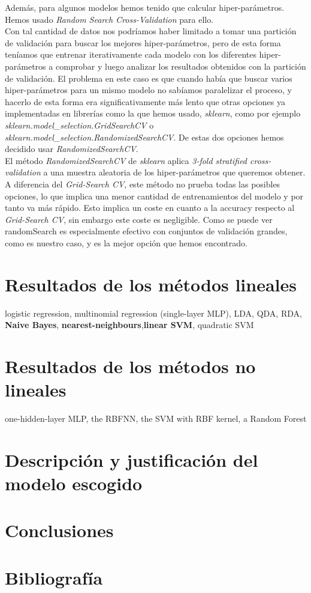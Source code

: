 \documentclass[a4paper]{article}
\begin{document}
Además, para algunos modelos hemos tenido que calcular hiper-parámetros. Hemos usado \textit{Random Search Cross-Validation} para ello.\\

Con tal cantidad de datos nos podríamos haber limitado a tomar una partición de validación para buscar los mejores hiper-parámetros, pero de esta forma teníamos que entrenar iterativamente cada modelo con los diferentes hiper-parámetros a comprobar y luego analizar los resultados obtenidos con la partición de validación. El problema en este caso es que cuando había que buscar varios hiper-parámetros para un mismo modelo no sabíamos paralelizar el proceso, y hacerlo de esta forma era significativamente más lento que otras opciones ya implementadas en librerías como la que hemos usado, \textit{sklearn}, como por ejemplo  \textit{sklearn.model\_selection.GridSearchCV} o \textit{sklearn.model\_selection.RandomizedSearchCV}. De estas dos opciones hemos decidido usar \textit{RandomizedSearchCV}.\\

El método \textit{RandomizedSearchCV} de \textit{sklearn} aplica \textit{3-fold stratified cross-validation} a una muestra aleatoria de los hiper-parámetros que queremos obtener. A diferencia del \textit{Grid-Search CV}, este método no prueba todas las posibles opciones, lo que implica una menor cantidad de entrenamientos del modelo y por tanto va más rápido. Esto implica un coste en cuanto a la accuracy respecto al \textit{Grid-Search CV}, sin embargo este coste es negligible. Como se puede ver randomSearch\cite{randomSearch} es especialmente efectivo con conjuntos de validación grandes, como es nuestro caso, y es la mejor opción que hemos encontrado.\\

\section{Resultados de los métodos lineales}
logistic regression, multinomial regression
(single-layer MLP), LDA, QDA, RDA, \textbf{Naive Bayes}, \textbf{nearest-neighbours},\textbf{linear SVM}, quadratic SVM
\section{Resultados de los métodos no lineales}
one-hidden-layer MLP, the RBFNN, the SVM with RBF kernel, a
Random Forest
\section{Descripción y justificación del modelo escogido}

\section{Conclusiones}

\clearpage
\section{Bibliografía}



\end{document}
